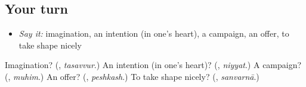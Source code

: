 \subsection*{Your turn}
\begin{itemize}
\raggedright
  \item \emph{Say it:} imagination, an intention (in one's heart), a campaign, an offer, to take shape nicely
\end{itemize}

\begin{tcolorbox}[breakable,colback=teal!4,colframe=teal!35!black,title={Before you move on}]
Imagination? (\textbf{}, \emph{tasavvur}.) An intention (in one's heart)? (\textbf{}, \emph{niyyat}.) A campaign? (\textbf{}, \emph{muhim}.) An offer? (\textbf{}, \emph{peshkash}.) To take shape nicely? (\textbf{}, \emph{sanvarnā}.)
\end{tcolorbox}
